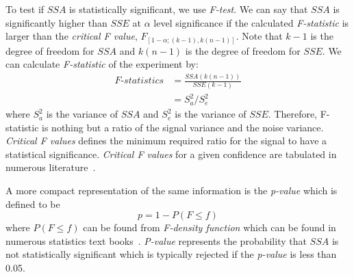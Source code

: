 To test if $\mathit{SSA}$ is statistically significant, we use
\emph{F-test}. We can say that $\mathit{SSA}$ is significantly higher
than $\mathit{SSE}$ at $\alpha$ level significance if the calculated
\emph{F-statistic} is larger than the \emph{critical F value},
$F_{[1-\alpha;(k-1),k(n-1)]}$. Note that $k-1$ is the degree of
freedom for $\mathit{SSA}$ and $k(n-1)$ is the degree of freedom for
$\mathit{SSE}$. We can calculate \emph{F-statistic} of the experiment
by:
\begin{equation}
\begin{split}
\textit{F-statistics}&=\frac{\mathit{SSA}(k(n-1))}{\mathit{SSE}(k-1)}\\
 &=S_a^2/S_e^2
\end{split}
\end{equation}
where $S_a^2$ is the variance of $\mathit{SSA}$ and $S_e^2$ is the
variance of $\mathit{SSE}$. Therefore, F-statistic is nothing but a ratio of the signal variance and the noise variance. \emph{Critical F values} defines the minimum required ratio for the signal to have a statistical significance.
\emph{Critical F values} for a given confidence are tabulated in numerous literature~\cite{lilja:2005}.

A more compact representation of the same information is the
\emph{p-value} which is defined to be
\begin{equation}
p=1-P(F\le f)
\end{equation}
where $P(F \le f)$ can be found from \emph{F-density function} which can
be found in numerous statistics text books~\cite{lilja:2005}.
\emph{P-value} represents the probability that $SSA$ is not statistically
significant which is typically rejected if the \emph{p-value} is less
than 0.05.
